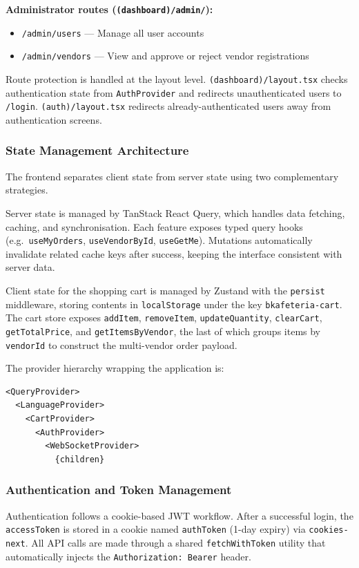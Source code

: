 \noindent
\textbf{Administrator routes (\texttt{(dashboard)/admin/}):}
\begin{itemize}
    \item \texttt{/admin/users} --- Manage all user accounts
    \item \texttt{/admin/vendors} --- View and approve or reject vendor registrations
\end{itemize}

\noindent
Route protection is handled at the layout level.
\texttt{(dashboard)/layout.tsx} checks authentication state from \texttt{AuthProvider} and redirects unauthenticated users to \texttt{/login}.
\texttt{(auth)/layout.tsx} redirects already-authenticated users away from authentication screens.

\subsubsection{State Management Architecture}
The frontend separates client state from server state using two complementary strategies.

\vspace{0.25cm}
\noindent
Server state is managed by TanStack React Query, which handles data fetching, caching, and synchronisation.
Each feature exposes typed query hooks (e.g.\ \texttt{useMyOrders}, \texttt{useVendorById}, \texttt{useGetMe}).
Mutations automatically invalidate related cache keys after success, keeping the interface consistent with server data.

\vspace{0.25cm}
\noindent
Client state for the shopping cart is managed by Zustand with the \texttt{persist} middleware, storing contents in \texttt{localStorage} under the key \texttt{bkafeteria-cart}.
The cart store exposes \texttt{addItem}, \texttt{removeItem}, \texttt{updateQuantity}, \texttt{clearCart}, \texttt{getTotalPrice}, and \texttt{getItemsByVendor}, the last of which groups items by \texttt{vendorId} to construct the multi-vendor order payload.

\vspace{0.25cm}
\noindent
The provider hierarchy wrapping the application is:

\begin{verbatim}
<QueryProvider>
  <LanguageProvider>
    <CartProvider>
      <AuthProvider>
        <WebSocketProvider>
          {children}
\end{verbatim}

\subsubsection{Authentication and Token Management}
Authentication follows a cookie-based JWT workflow.
After a successful login, the \texttt{accessToken} is stored in a cookie named \texttt{authToken} (1-day expiry) via \texttt{cookies-next}.
All API calls are made through a shared \texttt{fetchWithToken} utility that automatically injects the \texttt{Authorization: Bearer} header.

